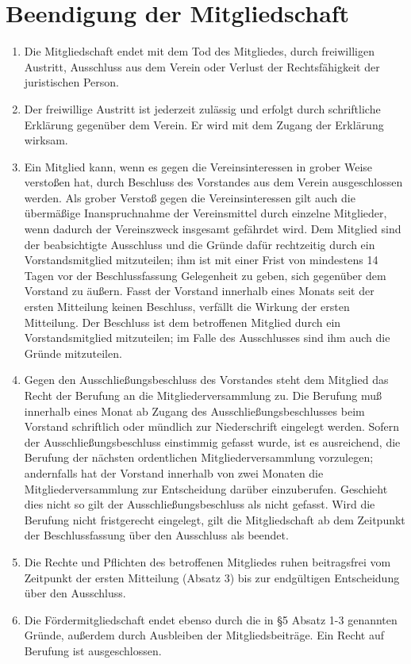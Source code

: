 \documentclass[ngerman]{scrartcl}
\begin{document}
\section{Beendigung der Mitgliedschaft} \label{sec:beendigung_der_mitgliedschaft}
\begin{enumerate}
 \item Die Mitgliedschaft endet mit dem Tod des Mitgliedes, durch
 freiwilligen Austritt, Ausschluss aus dem Verein oder Verlust
 der Rechtsfähigkeit der juristischen Person.

 \item Der freiwillige Austritt ist jederzeit zulässig und
 erfolgt durch schriftliche Erklärung gegenüber dem Verein. Er
 wird mit dem Zugang der Erklärung wirksam.

 \item Ein Mitglied kann, wenn es gegen die Vereinsinteressen in
 grober Weise verstoßen hat, durch Beschluss des Vorstandes aus
 dem Verein ausgeschlossen werden. Als grober Verstoß gegen
 die Vereinsinteressen gilt auch die übermäßige
 Inanspruchnahme der Vereinsmittel durch einzelne Mitglieder,
 wenn dadurch der Vereinszweck insgesamt gefährdet wird. Dem
 Mitglied sind der beabsichtigte Ausschluss und die Gründe
 dafür rechtzeitig durch ein Vorstandsmitglied mitzuteilen;
 ihm ist mit einer Frist von mindestens 14 Tagen vor der
 Beschlussfassung Gelegenheit zu geben, sich gegenüber dem
 Vorstand zu äußern. Fasst der Vorstand innerhalb eines Monats
 seit der ersten Mitteilung keinen Beschluss, verfällt die
 Wirkung der ersten Mitteilung. Der Beschluss ist dem
 betroffenen Mitglied durch ein Vorstandsmitglied
 mitzuteilen; im Falle des Ausschlusses sind ihm auch die
 Gründe mitzuteilen.

 \item Gegen den Ausschließungsbeschluss des Vorstandes steht dem
 Mitglied das Recht der Berufung an die Mitgliederversammlung
 zu. Die Berufung muß innerhalb eines Monat ab Zugang des
 Ausschließungsbeschlusses beim Vorstand schriftlich oder
 mündlich zur Niederschrift eingelegt werden. Sofern der
 Ausschließungsbeschluss einstimmig gefasst wurde, ist es
 ausreichend, die Berufung der nächsten ordentlichen
 Mitgliederversammlung vorzulegen; andernfalls hat der
 Vorstand innerhalb von zwei Monaten die Mitgliederversammlung
 zur Entscheidung darüber einzuberufen. Geschieht dies nicht
 so gilt der Ausschließungsbeschluss als nicht gefasst. Wird die
 Berufung nicht fristgerecht eingelegt, gilt die
 Mitgliedschaft ab dem Zeitpunkt der Beschlussfassung über den
 Ausschluss als beendet.

 \item Die Rechte und Pflichten des betroffenen Mitgliedes ruhen
 beitragsfrei vom Zeitpunkt der ersten Mitteilung (Absatz 3)
 bis zur endgültigen Entscheidung über den Ausschluss.

 \item Die Fördermitgliedschaft endet ebenso durch die in §5
 Absatz 1-3 genannten Gründe, außerdem durch Ausbleiben der
 Mitgliedsbeiträge. Ein Recht auf Berufung ist ausgeschlossen.
\end{enumerate}
\end{document}
